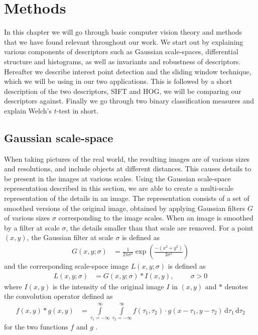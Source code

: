 \documentclass[thesis.tex]{subfiles}
\begin{document}
%
\chapter{Methods}
%
In this chapter we will go through basic computer vision theory and methods that we have found relevant throughout our work. We start out by explaining various components of descriptors such as Gaussian scale-spaces, differential structure and histograms, as well as invariants and robustness of descriptors. Hereafter we describe interest point detection and the sliding window technique, which we will be using in our two applications. This is followed by a short description of the two descriptors, SIFT and HOG, we will be comparing our descriptors against. Finally we go through two binary classification measures and explain Welch's $t$-test in short.
%
\section{Gaussian scale-space}
\label{sec:GaussianScaleSpace}
%
When taking pictures of the real world, the resulting images are of various sizes and resolutions, and include objects at different distances. This causes details to be present in the images at various scales. Using the Gaussian scale-space representation \cite{griffin1997scale,ginneken2000applications} described in this section, we are able to create a multi-scale representation of the details in an image. The representation consists of a set of smoothed versions of the original image, obtained by applying Gaussian filters $G$ of various sizes $\sigma$ corresponding to the image scales. When an image is smoothed by a filter at scale $\sigma$, the details smaller than that scale are removed. For a point $(x,y)$, the Gaussian filter at scale $\sigma$ is defined as
%
\begin{align}
	G(x,y;\sigma) &= \frac{1}{2\pi \sigma^2} \exp \left(\frac{-(x^2+y^2)}{2\sigma^2} \right)
\end{align}
%
and the corresponding scale-space image $L(x,y;\sigma)$ is defined as
%
\begin{align}
	L(x,y;\sigma) &= G(x,y;\sigma) \ast I(x,y),\hspace{1cm}\sigma > 0
\end{align}
%
where $I(x,y)$ is the intensity of the original image $I$ in $(x,y)$ and $\ast$ denotes the convolution operator defined as
\begin{align*}
	f(x,y) \ast g(x,y) &= \int\limits_{\tau_1 = -\infty}^\infty \int\limits_{\tau_2 = -\infty}^\infty f(\tau_1,\tau_2) \cdot g(x-\tau_1,y-\tau_2)\,\text{d}\tau_1\,\text{d}\tau_2
\end{align*}
for the two functions $f$ and $g$ \cite[p.~345]{gonzalez:2008:digital}.
\end{document}
